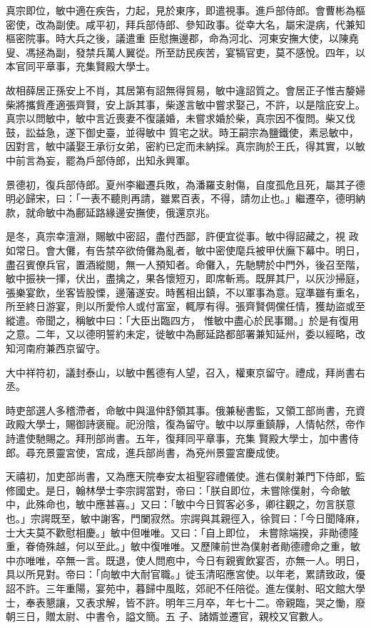 \begin{pinyinscope}
 真宗即位，敏中適在疾告，力起，見於東序，即遣視事。進戶部侍郎。會曹彬為樞密使，改為副使。咸平初，拜兵部侍郎、參知政事。從幸大名，屬宋湜病，代兼知樞密院事。時大兵之後，議遣重
 臣慰撫邊郡，命為河北、河東安撫大使，以陳堯叟、馮拯為副，發禁兵萬人翼從。所至訪民疾苦，宴犒官吏，莫不感悅。四年，以本官同平章事，充集賢殿大學士。



 故相薛居正孫安上不肖，其居第有詔無得貿易，敏中違詔質之。會居正子惟吉嫠婦柴將攜貲產適張齊賢，安上訴其事，柴遂言敏中嘗求娶己，不許，以是陰庇安上。真宗以問敏中，敏中言近喪妻不復議婚，未嘗求婚於柴，真宗因不復問。柴又伐鼓，訟益急，遂下御史臺，並得敏中
 質宅之狀。時王嗣宗為鹽鐵使，素忌敏中，因對言，敏中議娶王承衍女弟，密約已定而未納採。真宗詢於王氏，得其實，以敏中前言為妄，罷為戶部侍郎，出知永興軍。



 景德初，復兵部侍郎。夏州李繼遷兵敗，為潘羅支射傷，自度孤危且死，屬其子德明必歸宋，曰：「一表不聽則再請，雖累百表，不得，請勿止也。」繼遷卒，德明納款，就命敏中為鄜延路緣邊安撫使，俄還京兆。



 是冬，真宗幸澶淵，賜敏中密詔，盡付西鄙，許便宜從事。敏中得詔藏之，視
 政如常日。會大儺，有告禁卒欲倚儺為亂者，敏中密使麾兵被甲伏廡下幕中。明日，盡召賓僚兵官，置酒縱閱，無一人預知者。命儺入，先馳騁於中門外，後召至階，敏中振袂一揮，伏出，盡擒之，果各懷短刃，即席斬焉。既屏其尸，以灰沙掃庭，張樂宴飲，坐客皆股慄，邊藩遂安。時舊相出鎮，不以軍事為意。寇準雖有重名，所至終日游宴，則以所愛伶人或付富室，輒厚有得。張齊賢倜儻任情，獲劫盜或至縱遣。帝聞之，稱敏中曰：「大臣出臨四方，
 惟敏中盡心於民事爾。」於是有復用之意。二年，又以德明誓約未定，徙敏中為鄜延路都部署兼知延州，委以經略，改知河南府兼西京留守。



 大中祥符初，議封泰山，以敏中舊德有人望，召入，權東京留守。禮成，拜尚書右丞。



 時吏部選人多稽滯者，命敏中與溫仲舒領其事。俄兼秘書監，又領工部尚書，充資政殿大學士，賜御詩褒寵。祀汾陰，復為留守。敏中以厚重鎮靜，人情帖然，帝作詩遣使馳賜之。拜刑部尚書。五年，復拜同平章事，充集
 賢殿大學士，加中書侍郎。尋充景靈宮使，宮成，進兵部尚書，為兗州景靈宮慶成使。



 天禧初，加吏部尚書，又為應天院奉安太祖聖容禮儀使。進右僕射兼門下侍郎，監修國史。是日，翰林學士李宗諤當對，帝曰：「朕自即位，未嘗除僕射，今命敏中，此殊命也，敏中應甚喜。」又曰：「敏中今日賀客必多，卿往觀之，勿言朕意也。」宗諤既至，敏中謝客，門闌寂然。宗諤與其親徑入，徐賀曰：「今日聞降麻，士大夫莫不歡慰相慶。」敏中但唯唯。又曰：「自上即位，
 未嘗除端揆，非勛德隆重，眷倚殊越，何以至此。」敏中復唯唯。又歷陳前世為僕射者勛德禮命之重，敏中亦唯唯，卒無一言。既退，使人問庖中，今日有親賓飲宴否，亦無一人。明日，具以所見對。帝曰：「向敏中大耐官職。」徙玉清昭應宮使。以年老，累請致政，優詔不許。三年重陽，宴苑中，暮歸中風眩，郊祀不任陪從。進左僕射、昭文館大學士，奉表懇讓，又表求解，皆不許。明年三月卒，年七十二。帝親臨，哭之慟，廢朝三日，贈太尉、中書令，謚文簡。五
 子、諸婿並遷官，親校又官數人。




\end{pinyinscope}
